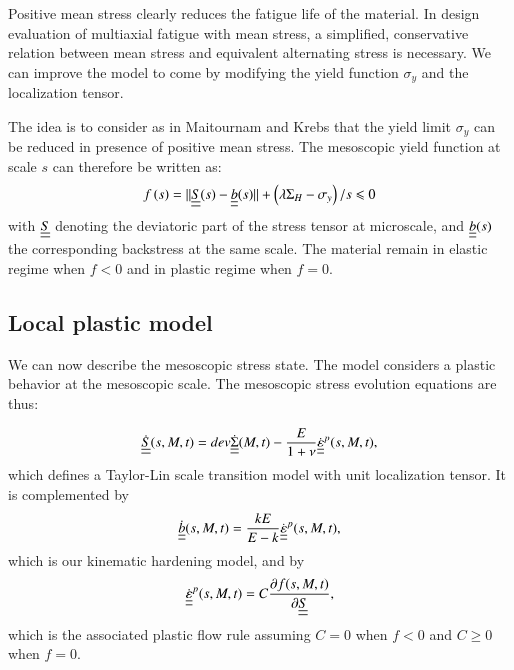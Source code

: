 \documentclass[3p,times,number,review]{elsarticle}
\begin{document}
Positive mean stress clearly reduces the fatigue life of the material. In design evaluation of multiaxial fatigue with mean stress, a simplified, conservative relation between mean stress and equivalent alternating stress is necessary. We can improve the model to come by modifying the yield function $\sigma_y$ and the localization tensor.

The idea is to consider as in Maitournam and Krebs\cite{Maitournam2011232} that the yield limit $\sigma_y$ can be reduced in presence of positive mean stress. The mesoscopic yield function at scale $s$ can therefore be written as:
\begin{equation}
f\left(s\right)=||\uline{\uline{S}}(s)-\uline{\uline{b}}(s)||+\left( \lambda \Sigma_H-\sigma_y\right) /s\leqslant 0
\label{yieldfun}
\end{equation}
with $\uline{\uline{S}}$ denoting the deviatoric part of the stress tensor at microscale, and $\uline{\uline{b}}(s)$ the corresponding backstress at the same scale. The material remain in elastic regime when $f<0$ and in plastic regime when $f=0$.

\subsection{Local plastic model}
We can now describe the mesoscopic stress state.  The model considers a plastic 
behavior at the mesoscopic scale. The mesoscopic stress evolution equations are thus:


\begin{equation}
\dot{\uline{\uline{S}}}(s,M,t)=dev\dot{\uline{\uline{\Sigma}}}(M,t)-\dfrac{E}{1+\nu}\dot{\uline{\uline{\varepsilon}}}^p(s,M,t), 
\label{eq.mesostress}
\end{equation}
which defines a Taylor-Lin scale transition model with unit localization tensor\cite{Bosia201239}. It is complemented by
\begin{equation}
\dot{\uline{\uline{b}}}(s,M,t)=\dfrac{kE}{E-k} \dot{\uline{\uline{\varepsilon}}}^p(s,M,t), 
\label{eq.backstress}
\end{equation}
which is our kinematic hardening model, and by
\begin{equation}
\dot{\uline{\uline{\varepsilon}}}^p(s,M,t)=C\dfrac{\partial f(s,M,t)}{\partial \uline{\uline{S}}}, 
\label{eq.plasticflow}
\end{equation}
which is the associated plastic flow rule assuming $C=0$ when $f<0$ and  $C\geqslant0$ when $f=0$.
\end{document}
